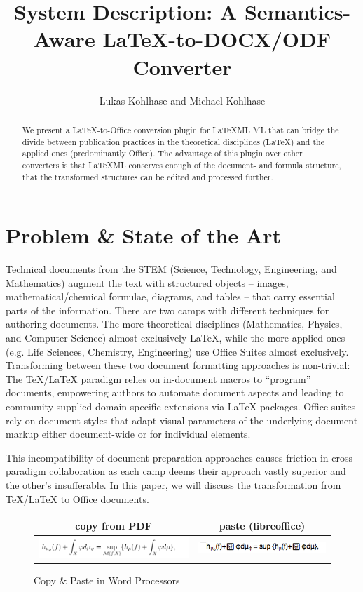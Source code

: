 \documentclass{llncs}
\title{System Description: A Semantics-Aware {\LaTeX}-to-DOCX/ODF Converter}
\author{Lukas Kohlhase and Michael Kohlhase}
\institute{Mathematics/Computer Science\\
  Jacobs University Bremen}
\def\latexml{{\LaTeX}ML\xspace}
\begin{document}
\maketitle
\begin{abstract}
  We present a {\LaTeX}-to-Office conversion plugin for \latexml ML that can bridge the
  divide between publication practices in the theoretical disciplines (\LaTeX) and the
  applied ones (predominantly Office). The advantage of this plugin over other converters
  is that \latexml conserves enough of the document- and formula structure, that the
  transformed structures can be edited and processed further.
\end{abstract}

\section{Problem \& State of the Art}\label{sec:intro}

Technical documents from the STEM (\underline{S}cience, \underline{T}echnology,
\underline{E}ngineering, and \underline{M}athematics) augment the text with structured
objects -- images, mathematical/chemical formulae, diagrams, and tables -- that carry
essential parts of the information. There are two camps with different techniques for
authoring documents. The more theoretical disciplines (Mathematics, Physics, and Computer
Science) almost exclusively {\LaTeX}, while the more applied ones (e.g. Life Sciences,
Chemistry, Engineering) use Office Suites almost exclusively. Transforming between these
two document formatting approaches is non-trivial: The {\TeX/\LaTeX} paradigm relies on
in-document macros to ``program'' documents, empowering authors to automate document
aspects and leading to community-supplied domain-specific extensions via \LaTeX
packages. Office suites rely on document-styles that adapt visual parameters of the
underlying document markup either document-wide or for individual elements.

This incompatibility of document preparation approaches causes friction in cross-paradigm
collaboration as each camp deems their approach vastly superior and the other's
insufferable. In this paper, we will discuss the transformation from {\TeX/\LaTeX} to
Office documents.

\begin{figure}[ht]
  \begin{tabular}{|c|c|}\hline%
    copy from PDF & paste (libreoffice)\\\hline
    \includegraphics[width=6cm]{mathsnippet} & 
    \includegraphics[width=5cm]{mathsnippet-libreoffice}\\\hline
  \end{tabular}
\caption{Copy \& Paste in Word Processors}\label{fig:cnp}
\end{figure}
\end{document}
